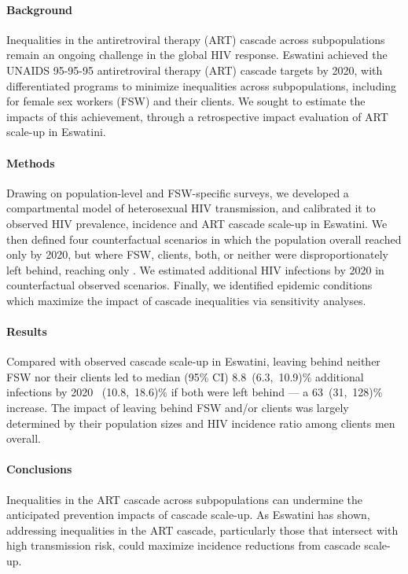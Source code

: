 \paragraph{Background}%
Inequalities in the antiretroviral therapy (ART) cascade across subpopulations
remain an ongoing challenge in the global HIV response.
Eswatini achieved the UNAIDS 95-95-95 antiretroviral therapy (ART) cascade targets by 2020,
with differentiated programs to minimize inequalities across subpopulations,
including for female sex workers (FSW) and their clients.
We sought to estimate the impacts of this achievement,
through a retrospective impact evaluation of ART scale-up in Eswatini.
\paragraph{Methods}
Drawing on population-level and FSW-specific surveys,
we developed a compartmental model of heterosexual HIV transmission,
and calibrated it to observed HIV prevalence, incidence and ART cascade scale-up in Eswatini.
We then defined four counterfactual scenarios in which
the population overall reached only \casmd by 2020,
but where FSW, clients, both, or neither
were disproportionately left behind, reaching only \caslo.
We estimated additional HIV infections by 2020
in counterfactual \vs observed scenarios.
Finally, we identified epidemic conditions which
maximize the impact of cascade inequalities via sensitivity analyses.
\paragraph{Results}
Compared with observed cascade scale-up in Eswatini,
leaving behind neither FSW nor their clients led to median (95\% CI)
8.8~(6.3,~10.9)\% additional infections by 2020 ~(10.8,~18.6)\% if both were left behind %
--- a 63~(31,~128)\% increase. %
The impact of leaving behind FSW and/or clients was largely determined by
their population sizes and HIV incidence ratio among clients \vs men overall.
\paragraph{Conclusions}
Inequalities in the ART cascade across subpopulations
can undermine the anticipated prevention impacts of cascade scale-up.
As Eswatini has shown,
addressing inequalities in the ART cascade,
particularly those that intersect with high transmission risk,
could maximize incidence reductions from cascade scale-up.
